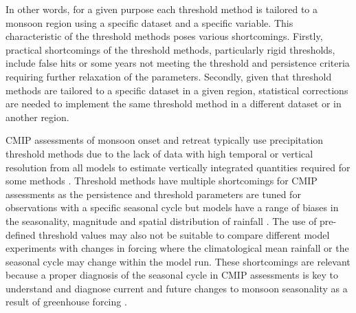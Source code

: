 

In other words, for a given purpose each threshold method is tailored to a monsoon region using a specific dataset and a specific variable. This characteristic of the threshold methods poses various shortcomings.  
 Firstly, practical shortcomings of the threshold methods, particularly rigid thresholds, include false hits \citep{moron2014interannual} or some years not meeting the threshold and persistence criteria \citep{arias2012} requiring further relaxation of the parameters. Secondly, given that threshold methods are tailored to a specific dataset in a given region, statistical corrections are needed to implement the same threshold method in a different dataset or in another region. 
 
 CMIP assessments of monsoon onset and retreat typically use precipitation threshold methods due to the lack of data with high temporal or vertical resolution from all models to estimate vertically integrated quantities required for some methods \citep[e.g.][]{geil2013,zou2015,jamoon2020}. Threshold methods have multiple shortcomings for CMIP assessments as the persistence and threshold parameters are tuned for observations with a specific seasonal cycle but models have a range of biases in the seasonality, magnitude and spatial distribution of rainfall \citep{pascale2019,garciafranco2020}. 
The use of pre-defined threshold values may also not be suitable to compare different model experiments with changes in forcing where the climatological mean rainfall or the seasonal cycle may change within the model run.
These shortcomings are relevant because a proper diagnosis of the seasonal cycle in CMIP assessments is key to understand and diagnose current and future changes to monsoon seasonality as a result of greenhouse forcing \citep{zhou2016,wang2017}. 

